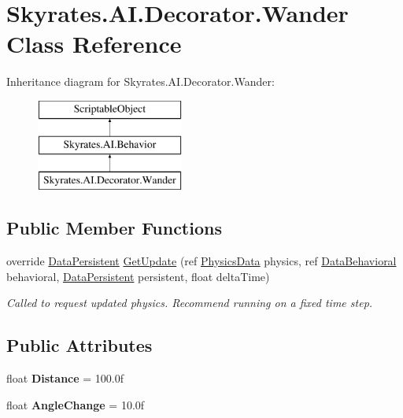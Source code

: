 \hypertarget{class_skyrates_1_1_a_i_1_1_decorator_1_1_wander}{\section{Skyrates.\-A\-I.\-Decorator.\-Wander Class Reference}
\label{class_skyrates_1_1_a_i_1_1_decorator_1_1_wander}
}
Inheritance diagram for Skyrates.\-A\-I.\-Decorator.\-Wander\-:\begin{figure}[H]
\begin{center}
\leavevmode
\includegraphics[height=3.000000cm]{class_skyrates_1_1_a_i_1_1_decorator_1_1_wander}
\end{center}
\end{figure}
\subsection*{Public Member Functions}
\begin{DoxyCompactItemize}
\item 
override \hyperlink{class_skyrates_1_1_a_i_1_1_behavior_1_1_data_persistent}{Data\-Persistent} \hyperlink{class_skyrates_1_1_a_i_1_1_decorator_1_1_wander_abc14a98c44e6d4d1adb5f3ceff782cf1}{Get\-Update} (ref \hyperlink{class_skyrates_1_1_physics_1_1_physics_data}{Physics\-Data} physics, ref \hyperlink{class_skyrates_1_1_a_i_1_1_behavior_1_1_data_behavioral}{Data\-Behavioral} behavioral, \hyperlink{class_skyrates_1_1_a_i_1_1_behavior_1_1_data_persistent}{Data\-Persistent} persistent, float delta\-Time)
\begin{DoxyCompactList}\small\item\em Called to request updated physics. Recommend running on a fixed time step. \end{DoxyCompactList}\end{DoxyCompactItemize}
\subsection*{Public Attributes}
\begin{DoxyCompactItemize}
\item 
\hypertarget{class_skyrates_1_1_a_i_1_1_decorator_1_1_wander_a89b9642bcadee3640c85b6f8ee9c666a}{float {\bfseries Distance} = 100.\-0f}\label{class_skyrates_1_1_a_i_1_1_decorator_1_1_wander_a89b9642bcadee3640c85b6f8ee9c666a}

\item 
\hypertarget{class_skyrates_1_1_a_i_1_1_decorator_1_1_wander_a126df845ff7974985cd150b1d66ec75d}{float {\bfseries Angle\-Change} = 10.\-0f}\label{class_skyrates_1_1_a_i_1_1_decorator_1_1_wander_a126df845ff7974985cd150b1d66ec75d}

\end{DoxyCompactItemize}
